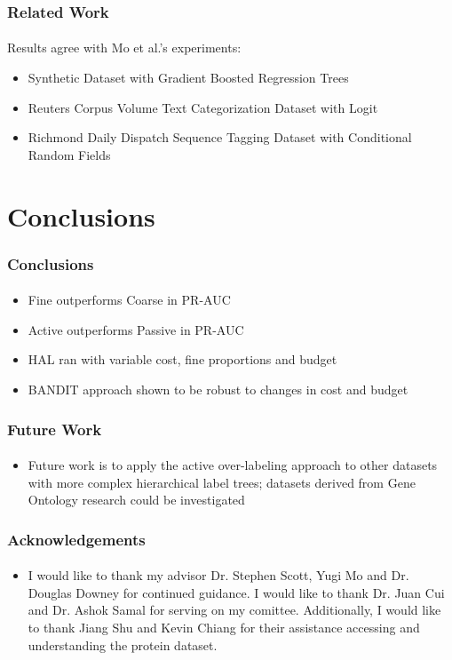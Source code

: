 \documentclass{beamer}
\begin{document}
\begin{frame}
    \frametitle{Related Work}  %
    \framesubtitle{}
    \par Results agree with Mo et al.'s experiments:
    \begin{itemize}
      \item Synthetic Dataset with Gradient Boosted Regression Trees
      \item Reuters Corpus Volume Text Categorization Dataset with Logit
      \item Richmond Daily Dispatch Sequence Tagging Dataset with Conditional Random Fields
    \end{itemize}
\end{frame}




\section{Conclusions}
\begin{frame}
    \frametitle{Conclusions}  %
    \framesubtitle{}
    \begin{itemize}
    \item Fine outperforms Coarse in PR-AUC
    \item Active outperforms Passive in PR-AUC
    \item HAL ran with variable cost, fine proportions and budget
    \item BANDIT approach shown to be robust to changes in cost and budget
    \end{itemize}
\end{frame}
\begin{frame}
    \frametitle{Future Work}  %
    \framesubtitle{}
    \begin{itemize}
      \item Future work is to apply the active over-labeling approach
      to other datasets with more complex hierarchical label trees;
      datasets derived from Gene Ontology research could be investigated
    \end{itemize}
\end{frame}
\begin{frame}
    \frametitle{Acknowledgements}
    \framesubtitle{}
    \begin{itemize}
      \item I would like to thank my advisor Dr. Stephen Scott,
      Yugi Mo and Dr. Douglas Downey for continued guidance. I would like to
      thank Dr. Juan Cui and Dr. Ashok Samal for serving on my comittee. Additionally,
      I would like to thank Jiang Shu and Kevin Chiang for their
      assistance accessing and understanding the protein dataset.
    \end{itemize}
\end{frame}
\end{document}

